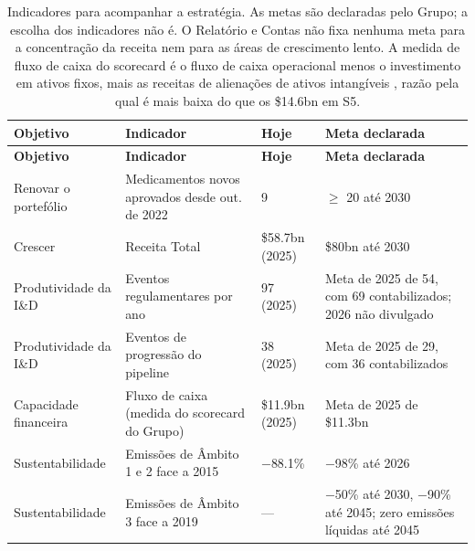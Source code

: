 \begin{xltabular}{\linewidth}{@{}N{2.5cm}Yp{2.2cm}Y@{}}
\caption{Indicadores para acompanhar a estratégia. As metas são declaradas pelo Grupo; a escolha dos indicadores não é. O Relatório e Contas não fixa nenhuma meta para a concentração da receita nem para as áreas de crescimento lento. A medida de fluxo de caixa do scorecard é o fluxo de caixa operacional menos o investimento em ativos fixos, mais as receitas de alienações de ativos intangíveis \cite[p.~91]{AR}, razão pela qual é mais baixa do que os \$14.6bn em S5.}\label{tab:indicadores}\\*
\toprule
\textbf{Objetivo} & \textbf{Indicador} & \textbf{Hoje} & \textbf{Meta declarada} \\*
\midrule
\endfirsthead
\toprule
\textbf{Objetivo} & \textbf{Indicador} & \textbf{Hoje} & \textbf{Meta declarada} \\*
\midrule
\endhead
\bottomrule
\endfoot
Renovar o portefólio & Medicamentos novos aprovados desde out. de 2022 & 9 & $\geq$ 20 até 2030 \cite[p.~10]{AR} \\
Crescer & Receita Total & \$58.7bn (2025) & \$80bn até 2030 \cite[p.~10]{AR} \\
Produtividade da I\&D & Eventos regulamentares por ano & 97 (2025) & Meta de 2025 de 54, com 69 contabilizados; 2026 não divulgado \cite[pp.~91, 102]{AR} \\
Produtividade da I\&D & Eventos de progressão do pipeline & 38 (2025) & Meta de 2025 de 29, com 36 contabilizados \cite[pp.~11, 91]{AR} \\
Capacidade financeira & Fluxo de caixa (medida do scorecard do Grupo) & \$11.9bn (2025) & Meta de 2025 de \$11.3bn \cite[p.~91]{AR} \\
Sustentabilidade & Emissões de Âmbito 1 e 2 face a 2015 & $-$88.1\% & $-$98\% até 2026 \cite[p.~42]{AR} \\
Sustentabilidade & Emissões de Âmbito 3 face a 2019 & --- & $-$50\% até 2030, $-$90\% até 2045; zero emissões líquidas até 2045 \cite[p.~42]{AR} \\
\end{xltabular}
